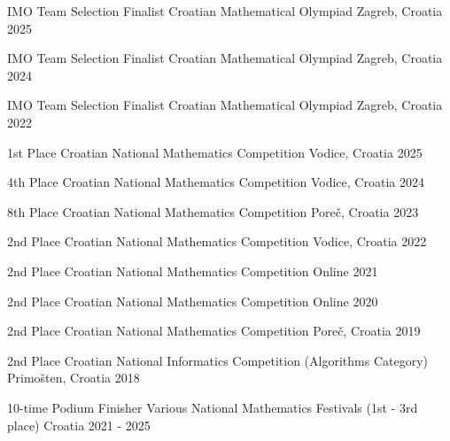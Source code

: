 \begin{cvhonors}

  \cvhonor
    {IMO Team Selection Finalist} %
    {Croatian Mathematical Olympiad} %
    {Zagreb, Croatia} %
    {2025} %

  \cvhonor
    {IMO Team Selection Finalist} %
    {Croatian Mathematical Olympiad} %
    {Zagreb, Croatia} %
    {2024} %

  \cvhonor
    {IMO Team Selection Finalist} %
    {Croatian Mathematical Olympiad} %
    {Zagreb, Croatia} %
    {2022} %


  \cvhonor
    {1st Place} %
    {Croatian National Mathematics Competition} %
    {Vodice, Croatia} %
    {2025} %

  \cvhonor
    {4th Place} %
    {Croatian National Mathematics Competition} %
    {Vodice, Croatia} %
    {2024} %

  \cvhonor
    {8th Place} %
    {Croatian National Mathematics Competition} %
    {Poreč, Croatia} %
    {2023} %

  \cvhonor
    {2nd Place} %
    {Croatian National Mathematics Competition} %
    {Vodice, Croatia} %
    {2022} %

  \cvhonor
    {2nd Place} %
    {Croatian National Mathematics Competition} %
    {Online} %
    {2021} %

  \cvhonor
    {2nd Place} %
    {Croatian National Mathematics Competition} %
    {Online} %
    {2020} %

  \cvhonor
    {2nd Place} %
    {Croatian National Mathematics Competition} %
    {Poreč, Croatia} %
    {2019} %


  \cvhonor
    {2nd Place} %
    {Croatian National Informatics Competition (Algorithms Category)} %
    {Primošten, Croatia} %
    {2018} %

    \cvhonor
  {10-time Podium Finisher} %
  {Various National Mathematics Festivals (1st - 3rd place)} %
  {Croatia} %
  {2021 - 2025} %

\end{cvhonors}
